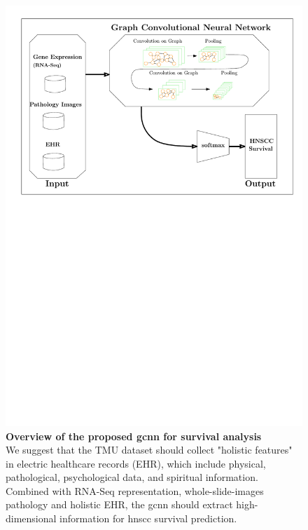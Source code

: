 \documentclass[12pt, a4paper]{article}
\newcommand{\bcaption}[2]{\caption{\textbf{#1} #2}}
\begin{document}
\begin{figure}[hp]
\centering
\includegraphics[width=14cm]{GCNN_survival.pdf}
\bcaption{Overview of the proposed \acrshort{gcnn} for survival analysis}
{\\We suggest that the TMU dataset should collect "holistic features" in electric healthcare records (EHR), which include physical, pathological, psychological data, and spiritual information. Combined with RNA-Seq representation, whole-slide-images pathology and holistic EHR, the \acrfull{gcnn} should extract high-dimensional information for \acrshort{hnscc} survival prediction.}
\label{fig:GCNN}
\end{figure}


\end{document}
